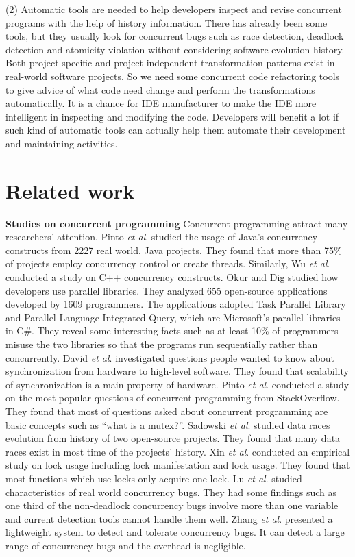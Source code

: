 \documentclass[conference]{IEEEtran}
\begin{document}
(2) Automatic tools are needed to help developers inspect and revise concurrent programs with the help of history information. There has already been some tools, but they usually look for concurrent bugs such as race detection, deadlock detection and atomicity violation without considering software evolution history. Both project specific and project independent transformation patterns exist in real-world software projects. So we need some concurrent code refactoring tools to give advice of what code need change and perform the transformations automatically. It is a chance for IDE manufacturer to make the IDE more intelligent in inspecting and modifying the code. Developers will benefit a lot if such kind of automatic tools can actually help them automate their development and maintaining activities.

\section{Related work}
\textbf{Studies on concurrent programming}
Concurrent programming attract many researchers' attention. Pinto \textit{et al}. \cite{journals/jss/PintoTFFB15} studied the usage of Java's concurrency constructs from 2227 real world, Java projects. They found that more than 75\% of projects employ concurrency control or create threads. Similarly, Wu \textit{et al}. \cite{journals/infsof/WuCZX16} conducted a study on C++ concurrency constructs. Okur and Dig \cite{conf/sigsoft/OkurD12} studied how developers use parallel libraries. They analyzed 655 open-source applications developed by 1609 programmers. The applications adopted Task Parallel Library and Parallel Language Integrated Query, which are Microsoft's parallel libraries in C\#. They reveal some interesting facts such as at least 10\% of programmers misuse the two libraries so that the programs run sequentially rather than concurrently. David \textit{et al}. \cite{conf/sosp/DavidGT13} investigated questions people wanted to know about synchronization from hardware to high-level software. They found that scalability of synchronization is a main property of hardware. Pinto \textit{et al}. \cite{conf/oopsla/PintoTC15} conducted a study on the most popular questions of concurrent programming from StackOverflow. They found that most of questions asked about concurrent programming are basic concepts such as ``what is a mutex?''. Sadowski \textit{et al}. \cite{conf/msr/SadowskiYK12} studied data races evolution from history of two open-source projects. They found that many data races exist in most time of the projects' history. Xin \textit{et al}. \cite{conf/icsm/XinQHXZWG13} conducted an empirical study on lock usage including lock manifestation and lock usage. They found that most functions which use locks only acquire one lock. Lu \textit{et al}. \cite{conf/asplos/LuPSZ08} studied characteristics of real world concurrency bugs. They had some findings such as one third of the non-deadlock concurrency bugs involve more than one variable and current detection tools cannot handle them well. Zhang \textit{et al}. \cite{journals/tse/ZhangWLQRZ16} presented a lightweight system to detect and tolerate concurrency bugs. It can detect a large range of concurrency bugs and the overhead is negligible.
\end{document}
